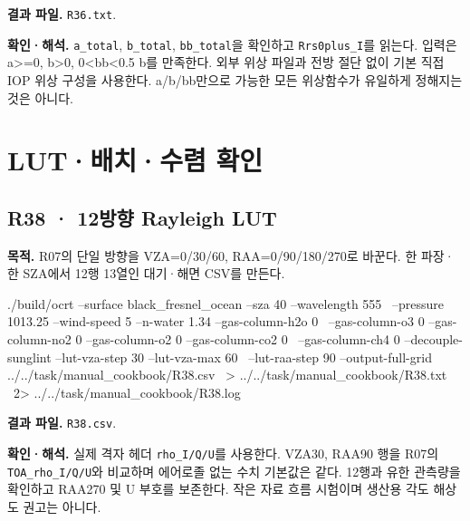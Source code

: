 \textbf{결과 파일. }\texttt{R36.txt}.

\textbf{확인·해석. }\texttt{a\_\allowbreak{}total}, \texttt{b\_\allowbreak{}total}, \texttt{bb\_\allowbreak{}total}을 확인하고 \texttt{Rrs0plus\_\allowbreak{}I}를 읽는다. 입력은 a>=0, b>0, 0<bb<0.5 b를 만족한다. 외부 위상 파일과 전방 절단 없이 기본 직접 IOP 위상 구성을 사용한다. a/b/bb만으로 가능한 모든 위상함수가 유일하게 정해지는 것은 아니다.

\clearpage

\section{LUT·배치·수렴 확인}

\label{sec:auto:09_cookbook:6}

\label{sec:cookbook_group:workflow}

\subsection{R38 · 12방향 Rayleigh LUT}
\label{sec:auto:09_cookbook:6.1}

\label{recipe:R38}

\textbf{목적. }R07의 단일 방향을 VZA=0/30/60\textdegree{}, RAA=0/90/180/270\textdegree{}로 바꾼다. 한 파장·한 SZA에서 12행 13열인 대기·해면 CSV를 만든다.

\noindent\begin{minipage}{\linewidth}
\begin{ManualCode}

./build/ocrt --surface black_fresnel_ocean --sza 40 --wavelength 555 \
  --pressure 1013.25 --wind-speed 5 --n-water 1.34 --gas-column-h2o 0 \
  --gas-column-o3 0 --gas-column-no2 0 --gas-column-o2 0 --gas-column-co2 0 \
  --gas-column-ch4 0 --decouple-sunglint --lut-vza-step 30 --lut-vza-max 60 \
  --lut-raa-step 90 --output-full-grid ../../task/manual_cookbook/R38.csv \
  > ../../task/manual_cookbook/R38.txt \
  2> ../../task/manual_cookbook/R38.log

\end{ManualCode}
\end{minipage}\par

\textbf{결과 파일. }\texttt{R38.csv}.

\textbf{확인·해석. }실제 격자 헤더 \texttt{rho\_\allowbreak{}I/\allowbreak{}Q/\allowbreak{}U}를 사용한다. VZA30\textdegree{}, RAA90\textdegree{} 행을 R07의 \texttt{TOA\_\allowbreak{}rho\_\allowbreak{}I/\allowbreak{}Q/\allowbreak{}U}와 비교하며 에어로졸 없는 수치 기본값은 같다. 12행과 유한 관측량을 확인하고 RAA270\textdegree{} 및 U 부호를 보존한다. 작은 자료 흐름 시험이며 생산용 각도 해상도 권고는 아니다.

